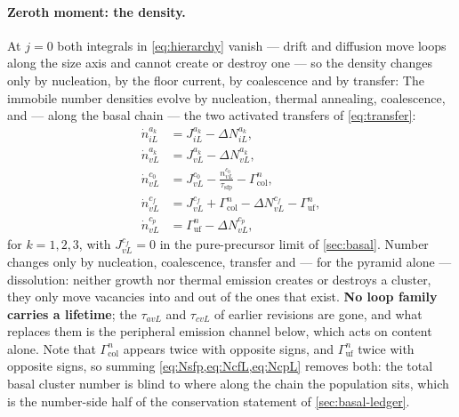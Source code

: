 \documentclass{article}
\begin{document}
\paragraph{Zeroth moment: the density.} At $j=0$ both integrals in
\cref{eq:hierarchy} vanish --- drift and diffusion move loops along the size axis
and cannot create or destroy one --- so the density changes only by nucleation,
by the floor current, by coalescence and by transfer:
The immobile number densities evolve by nucleation, thermal annealing,
coalescence, and --- along the basal chain --- the two activated transfers of
\cref{eq:transfer}:
\begin{align}
  \dot n^{a_k}_{iL} &= J^{a_k}_{iL}-\Delta N^{a_k}_{iL},
  \label{eq:NiL}\\
  \dot n^{a_k}_{vL} &= J^{a_k}_{vL}-\Delta N^{a_k}_{vL},
  \label{eq:NavL}\\
  \dot n^{c_0}_{vL} &= J^{c_0}_{vL}
      -\frac{n^{c_0}_{vL}}{\tau_{\mathrm{sfp}}}
      -\Gamma^{n}_{\mathrm{col}},
  \label{eq:Nsfp}\\
  \dot n^{c_f}_{vL} &= J^{c_f}_{vL}+\Gamma^{n}_{\mathrm{col}}
      -\Delta N^{c_f}_{vL}
      -\Gamma^{n}_{\mathrm{uf}},
  \label{eq:NcfL}\\
  \dot n^{c_p}_{vL} &= \Gamma^{n}_{\mathrm{uf}}
      -\Delta N^{c_p}_{vL},
  \label{eq:NcpL}
\end{align}
for $k=1,2,3$, with $J^{c_f}_{vL}=0$ in the pure-precursor limit of
\cref{sec:basal}. Number changes only by nucleation, coalescence, transfer and
--- for the pyramid alone --- dissolution: neither growth nor thermal emission
creates or destroys a cluster, they only move vacancies into and out of the ones
that exist. \textbf{No loop family carries a lifetime}; the $\tau_{avL}$ and
$\tau_{cvL}$ of earlier revisions are gone, and what replaces them is the
peripheral emission channel below, which acts on content alone.
Note that $\Gamma^{n}_{\mathrm{col}}$ appears twice with opposite signs, and
$\Gamma^{n}_{\mathrm{uf}}$ twice with opposite signs, so summing
\cref{eq:Nsfp,eq:NcfL,eq:NcpL} removes both: the total basal cluster number is
blind to where along the chain the population sits, which is the number-side half
of the conservation statement of \cref{sec:basal-ledger}.
\end{document}

